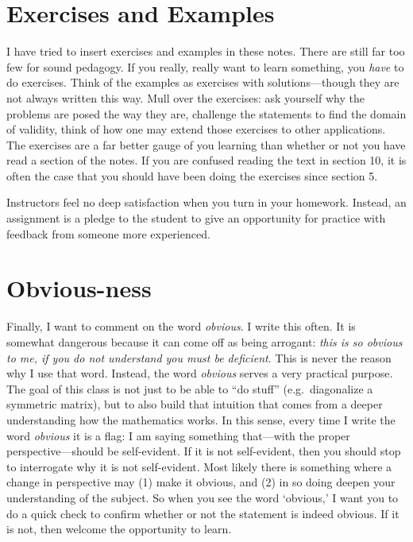 \documentclass[12pt, oneside]{report}    %
\let\oldsection\section
\def\section{%
  \setcounter{sidenote}{1}%
  \oldsection
}
\begin{document}
\section{Exercises and Examples}
I have tried to insert exercises and examples in these notes. There are still far too few for sound pedagogy. If you really, really want to learn something, you \emph{have} to do exercises. Think of the examples as exercises with solutions---though they are not always written this way. Mull over the exercises: ask yourself why the problems are posed the way they are, challenge the statements to find the domain of validity, think of how one may extend those exercises to other applications. The exercises are a far better gauge of you learning than whether or not you have read a section of the notes. If you are confused reading the text in section 10, it is often the case that you should have been doing the exercises since section 5.

\begin{bigidea}
Instructors feel no deep satisfaction when you turn in your homework. Instead, an assignment is a pledge to the student to give an opportunity for practice with feedback from someone more experienced.
\end{bigidea}

\section{Obvious-ness}
Finally, I want to comment on the word \emph{obvious}. I write this often. It is somewhat dangerous because it can come off as being arrogant: \emph{this is so obvious to me, if you do not understand you must be deficient}. This is never the reason why I use that word. Instead, the word \emph{obvious} serves a very practical purpose. The goal of this class is not just to be able to ``do stuff'' (e.g.~diagonalize a symmetric matrix), but to also build that intuition that comes from a deeper understanding how the mathematics works. In this sense, every time I write the word \emph{obvious} it is a flag: I am saying something that---with the proper perspective---should be self-evident. If it is not self-evident, then you should stop to interrogate why it is not self-evident. Most likely there is something where a change in perspective may (1) make it obvious, and (2) in so doing deepen your understanding of the subject. So when you see the word `obvious,' I want you to do a quick check to confirm whether or not the statement is indeed obvious. If it is not, then welcome the opportunity to learn.
\end{document}
